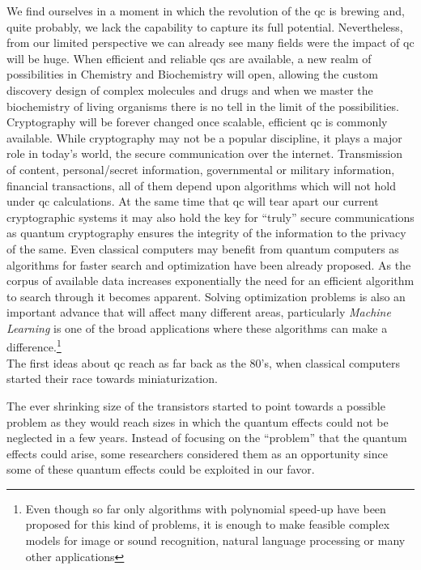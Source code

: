We find ourselves in a moment in which the revolution of the \acl{qc} is brewing and, quite probably, we lack the capability to capture its full potential. Nevertheless, from our limited perspective we can already see many fields were the impact of \acl{qc} will be huge.
When efficient and reliable \acp{qc} are available, a new realm of possibilities in Chemistry and Biochemistry will open, allowing the custom discovery design of complex molecules and drugs and when we master the biochemistry of living organisms there is no tell in the limit of the possibilities.
Cryptography will be forever changed once scalable, efficient \acl{qc} is commonly available. While cryptography may not be a popular discipline, it plays a major role in today's world, the secure communication over the internet. Transmission of content, personal/secret information, governmental or military information, financial transactions, all of them depend upon algorithms which will not hold under \acl{qc} calculations\cite{Shor1994}.
At the same time that \ac{qc} will tear apart our current cryptographic systems it may also hold the key for ``truly'' secure communications as quantum cryptography ensures the integrity of the information to the privacy of the same.
Even classical computers may benefit from quantum computers as algorithms for faster search and optimization have been already proposed. As the corpus of available data increases exponentially the need for an efficient algorithm to search through it\cite{Grover1997} becomes apparent. Solving optimization problems\cite{Durr2006,Montanaro2016,Brandao2017} is also an important advance that will affect many different areas, particularly \emph{Machine Learning} is one of the broad applications where these algorithms can make a difference.\footnote{Even though so far only algorithms with polynomial speed-up have been proposed for this kind of problems, it is enough to make feasible complex models for image or sound recognition, natural language processing or many other applications}\\


The first ideas about \acl{qc} reach as far back as the 80's\cite{Benioff1980,Feynman1982}, when classical computers started their race towards miniaturization.

The ever shrinking size of the transistors\cite{Moore1965} started to point towards a possible problem as they would reach sizes in which the quantum effects could not be neglected in a few years.
Instead of focusing on the ``problem'' that the quantum effects could arise, some researchers\cite{Benioff1980,Feynman1982} considered them as an opportunity since some of these quantum effects could be exploited in our favor.

